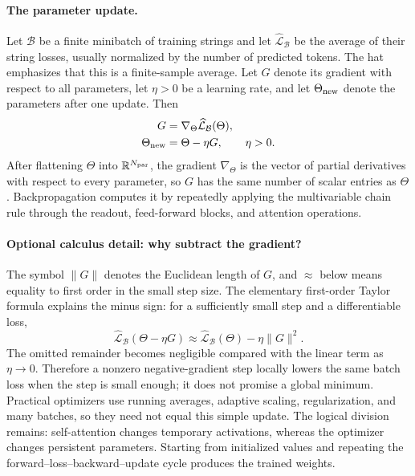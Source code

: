 \documentclass[
  aps,
  reprint,
  superscriptaddress,
  floatfix,
  nofootinbib,
  longbibliography
]{revtex4-2}
\newcommand{\R}{\mathbb{R}}
\newcommand{\norm}[1]{\lVert #1 \rVert}
\begin{document}
\paragraph{The parameter update.}
Let $\mathcal B$ be a finite minibatch of training strings and let
$\widehat{\mathcal L}_{\mathcal B}$ be the average of their string losses,
usually normalized by the number of predicted tokens.  The hat emphasizes that
this is a finite-sample average.  Let $G$ denote its gradient with respect to
all parameters, let $\eta>0$ be a learning rate, and let $\Theta_{\rm new}$
denote the parameters after one update.  Then
\begin{equation}
\label{eq:app-training-update}
\begin{aligned}
G&=\nabla_\Theta
\widehat{\mathcal L}_{\mathcal B}(\Theta),\\
\Theta_{\rm new}&=\Theta-\eta G,
\qquad \eta>0.
\end{aligned}
\end{equation}
After flattening $\Theta$ into $\R^{N_{\rm par}}$, the gradient
$\nabla_\Theta$ is the vector of partial derivatives with respect to every
parameter, so $G$ has the same number of scalar entries as $\Theta$.
Backpropagation computes it by repeatedly applying the multivariable chain rule
through the readout, feed-forward blocks, and attention operations.

\paragraph{Optional calculus detail: why subtract the gradient?}
The symbol $\norm{G}$ denotes the Euclidean length of $G$, and $\approx$ below
means equality to first order in the small step size.  The elementary
first-order Taylor formula explains the minus sign: for a sufficiently small
step and a differentiable loss,
\begin{equation}
\label{eq:app-first-order-descent}
\widehat{\mathcal L}_{\mathcal B}(\Theta-\eta G)
\approx
\widehat{\mathcal L}_{\mathcal B}(\Theta)
-\eta\norm{G}^2.
\end{equation}
The omitted remainder becomes negligible compared with the linear term as
$\eta\to0$.  Therefore a nonzero negative-gradient step locally lowers the
same batch loss when the step is small enough; it does not promise a global
minimum.  Practical optimizers use running averages, adaptive scaling,
regularization, and many batches, so they need not equal this simple update.
The logical division remains: self-attention changes temporary activations,
whereas the optimizer changes persistent parameters.  Starting from initialized
values and repeating the forward--loss--backward--update cycle produces the
trained weights.
\end{document}
